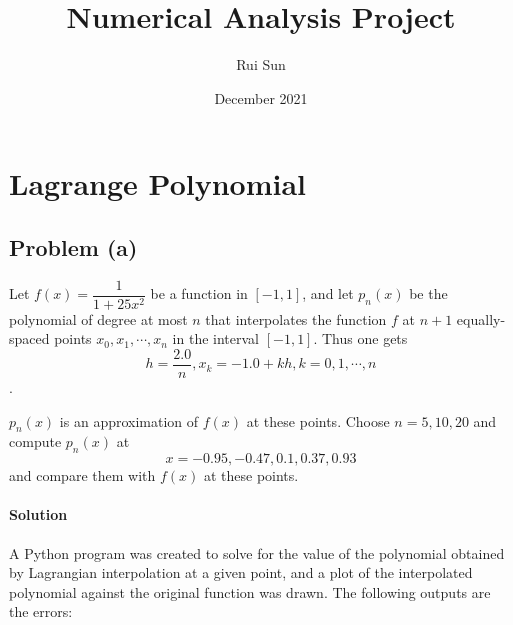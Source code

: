 \documentclass[UTF8,hyperref]{article}
\title{Numerical Analysis Project}
\author{Rui Sun}
\date{December 2021}
\begin{document}
\maketitle

\section{Lagrange Polynomial}

\subsection{Problem (a)}
\par Let $f(x)=\dfrac{1}{1+25x^2}$ be a function in $[-1,1]$, and let $p_n(x)$ be the polynomial of degree at most $n$ that interpolates the function $f$ at $n+1$ equally-spaced points $x_0,x_1,\cdots,x_n$ in the interval $[-1,1]$. Thus one gets
\begin{equation}
    h=\frac{2.0}{n}, x_k=-1.0+kh, k=0,1,\cdots,n
\end{equation}
.
\par $p_n(x)$ is an approximation of $f(x)$ at these points. Choose $n=5,10,20$ and compute $p_n(x)$ at
$$
x=-0.95,-0.47,0.1,0.37,0.93
$$
and compare them with $f(x)$ at these points.

\paragraph{Solution} A Python program was created to solve for the value of the polynomial obtained by Lagrangian interpolation at a given point, and a plot of the interpolated polynomial against the original function was drawn.
The following outputs are the errors:
\end{document}
